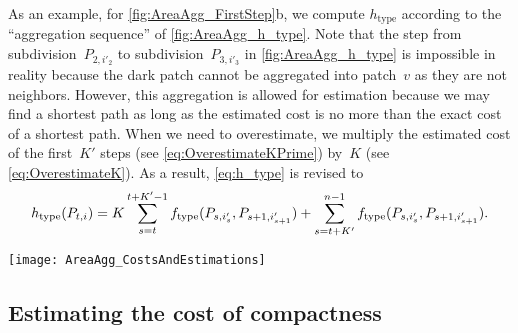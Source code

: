 \documentclass[acmsmall,natbib=false]{acmart}
\begin{document}
As an example, for \fig\ref{fig:AreaAgg_FirstStep}b, we compute 
$h_\mathrm{type}$ 
according to the ``aggregation sequence'' of 
\fig\ref{fig:AreaAgg_h_type}.
Note that the step from
subdivision~$P_{2,i'_2}$ to subdivision~$P_{3,i'_3}$ 
in \fig\ref{fig:AreaAgg_h_type} is impossible in reality 
because the dark patch cannot be aggregated into patch~$v$
as they are not neighbors. 
However, this aggregation is allowed for estimation 
because we may find a shortest path as long as 
the estimated cost is no more than 
the exact cost of a shortest path.
When we need to overestimate, we multiply the estimated cost of the 
first~$K'$ steps (see \eq\ref{eq:OverestimateKPrime}) 
by~$K$ (see \eq\ref{eq:OverestimateK}).
As a result, \fo\ref{eq:h_type} is revised to
\begin{equation}
\label{eq:o_type}
h_\mathrm{type}(P_{t,i})=
K\sum_{s=t}^{t+K'-1}f_\mathrm{type}(P_{s,i'_s},P_{s+1,i'_{s+1}})+
\sum_{s=t+K'}^{n-1}f_\mathrm{type}(P_{s,i'_s},P_{s+1,i'_{s+1}}).
\end{equation}


\begin{figure*}[tb]
\centering
\texttt{[image: AreaAgg\_CostsAndEstimations]}
\caption{An ``aggregation sequence'' for computing
    the estimated cost of type change~$h_{\mathrm{type}}$
    (see \eqs\ref{eq:h_type} and~\ref{eq:o_type}),
	based on the aggregation result of 
	\fig\ref{fig:AreaAgg_FirstStep}b.
    Note that this aggregation sequence is impossible in reality,
    but it is fine for estimating
    (see the argument in \sect\ref{sec:AreaAgg_h_type}).}
\label{fig:AreaAgg_h_type}
\end{figure*}


\subsection{Estimating the cost of compactness}
\label{sec:AreaAgg_h_comp}
\end{document}
